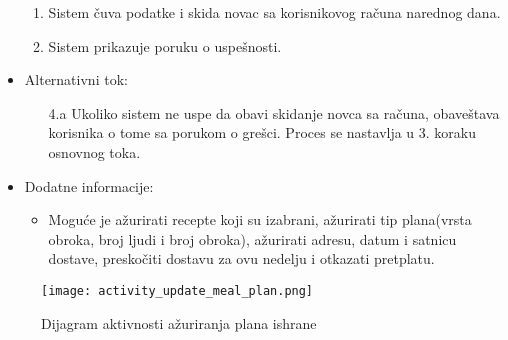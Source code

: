 \begin{itemize}
\begin{enumerate}
            \item Sistem čuva podatke i skida novac sa korisnikovog računa narednog dana.
            \item Sistem prikazuje poruku o uspešnosti. 
        \end{enumerate}
    \item Alternativni tok:
        \begin{itemize}
            \item[4.a] Ukoliko sistem ne uspe da obavi skidanje novca sa računa, obaveštava korisnika o tome sa porukom o grešci. Proces se nastavlja u 3. koraku osnovnog toka.
        \end{itemize}
    \item Dodatne informacije:
        \begin{itemize}
            \item Moguće je ažurirati recepte koji su izabrani, ažurirati tip plana(vrsta obroka, broj ljudi i broj obroka), ažurirati adresu, datum i satnicu dostave, preskočiti dostavu za ovu nedelju i otkazati pretplatu. 
        \end{itemize}
\end{itemize}

\begin{figure}[H]
\begin{center}
\texttt{[image: activity\_update\_meal\_plan.png]}
\end{center}
    \caption{Dijagram aktivnosti ažuriranja plana ishrane}
\label{fig:ActivityUpdateMealPlan}
\end{figure}

